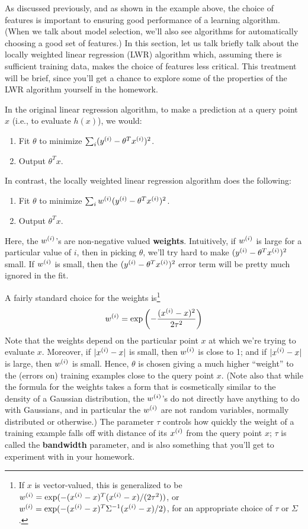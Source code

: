 \documentclass{article}
\begin{document}
As discussed previously, and as shown in the example above, the choice
of features is important to ensuring good performance of a learning algorithm.
(When we talk about model selection, we'll also see algorithms for automatically
choosing a good set of features.)  In this section, let us talk
briefly talk about the locally weighted linear regression (LWR) algorithm which,
assuming there is sufficient training data, makes the choice of features
less critical.  This treatment will be brief, since you'll get a chance to
explore some of the properties of the LWR algorithm yourself in the homework.

In the original linear regression algorithm, to make a prediction at a query
point $x$ (i.e., to evaluate $h(x)$), we would:
\begin{enumerate}
\item Fit $\theta$ to minimize $\sum_i ({y^{(i)}} - \theta^T{x^{(i)}})^2$.
\item Output $\theta^Tx$.
\end{enumerate}

In contrast, the locally weighted linear regression algorithm does the following:
\begin{enumerate}
\item Fit $\theta$ to minimize $\sum_i {w^{(i)}} ({y^{(i)}} - \theta^T{x^{(i)}})^2$.
\item Output $\theta^Tx$.
\end{enumerate}
Here, the ${w^{(i)}}$'s are non-negative valued {\bf weights}. Intuitively, if ${w^{(i)}}$
is large for a particular value of $i$, then in picking $\theta$, we'll try hard to
make $({y^{(i)}} - \theta^T{x^{(i)}})^2$ small.  If ${w^{(i)}}$ is small, then the
$({y^{(i)}} - \theta^T{x^{(i)}})^2$ error term will be pretty much ignored in the fit.

A fairly standard choice for the weights is\footnote{If $x$ is vector-valued,
this is generalized to be
${w^{(i)}} = \exp(-({x^{(i)}} - x)^T({x^{(i)}}-x)/(2\tau^2))$, or
${w^{(i)}} = \exp(-({x^{(i)}} - x)^T\Sigma^{-1}({x^{(i)}}-x)/2)$, for
an appropriate choice of $\tau$ or $\Sigma$.}
\[
{w^{(i)}} = \exp\left(-\frac{({x^{(i)}} - x)^2}{2\tau^2}\right)
\]
Note that the weights depend on the particular point $x$ at which we're
trying to evaluate $x$.  Moreover, if $|{x^{(i)}} - x|$ is small, then ${w^{(i)}}$ is
close to 1; and if $|{x^{(i)}}-x|$ is large, then ${w^{(i)}}$ is small.  Hence, $\theta$
is chosen giving a much higher ``weight'' to the (errors on) training
examples close to the query point $x$.  (Note also that while the formula
for the weights takes a form that is cosmetically similar to the
density of a Gaussian distribution, the ${w^{(i)}}$'s do not directly have
anything to do with Gaussians, and in particular the ${w^{(i)}}$ are not random
variables, normally distributed or otherwise.)
The parameter $\tau$ controls how quickly the weight of a training example
falls off with distance of its ${x^{(i)}}$ from the query point $x$; $\tau$ is called
the {\bf bandwidth} parameter, and is also something that you'll get to
experiment with in your homework.
\end{document}
